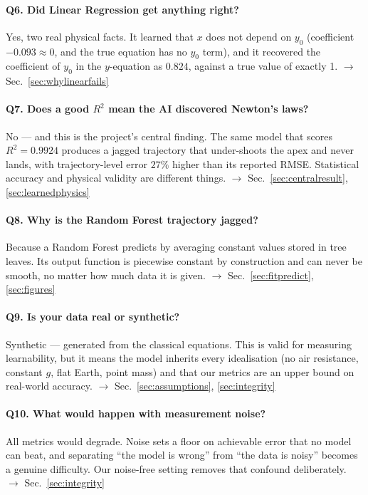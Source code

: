 \documentclass[11pt,a4paper]{article}
\newcommand{\yzero}{y_{0}}
\newcommand{\Rsq}{R^{2}}
\begin{document}
\paragraph{Q6. Did Linear Regression get anything right?}
Yes, two real physical facts. It learned that $x$ does not depend on $\yzero$ (coefficient
$-0.093\approx0$, and the true equation has no $\yzero$ term), and it recovered the coefficient of
$\yzero$ in the $y$-equation as $0.824$, against a true value of exactly 1.
$\rightarrow$ Sec.~\ref{sec:whylinearfails}

\paragraph{Q7. Does a good $\Rsq$ mean the AI discovered Newton's laws?}
No --- and this is the project's central finding. The same model that scores $\Rsq=0.9924$ produces a
jagged trajectory that under-shoots the apex and never lands, with trajectory-level error $27\%$
higher than its reported RMSE. Statistical accuracy and physical validity are different things.
$\rightarrow$ Sec.~\ref{sec:centralresult}, \ref{sec:learnedphysics}

\paragraph{Q8. Why is the Random Forest trajectory jagged?}
Because a Random Forest predicts by averaging constant values stored in tree leaves. Its output
function is piecewise constant by construction and can never be smooth, no matter how much data it is
given. $\rightarrow$ Sec.~\ref{sec:fitpredict}, \ref{sec:figures}

\paragraph{Q9. Is your data real or synthetic?}
Synthetic --- generated from the classical equations. This is valid for measuring learnability, but it
means the model inherits every idealisation (no air resistance, constant $g$, flat Earth, point mass)
and that our metrics are an upper bound on real-world accuracy.
$\rightarrow$ Sec.~\ref{sec:assumptions}, \ref{sec:integrity}

\paragraph{Q10. What would happen with measurement noise?}
All metrics would degrade. Noise sets a floor on achievable error that no model can beat, and
separating ``the model is wrong'' from ``the data is noisy'' becomes a genuine difficulty. Our
noise-free setting removes that confound deliberately. $\rightarrow$ Sec.~\ref{sec:integrity}
\end{document}
